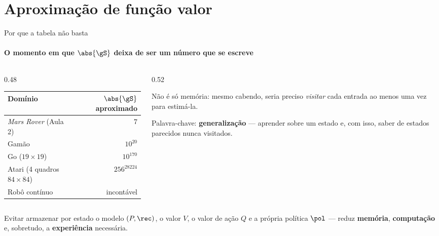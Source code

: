 \documentclass[aspectratio=169, 11pt]{beamer}
\begin{document}
\section{Aproximação de função valor}

\begin{frame}{Por que a tabela não basta}
  \framesubtitle{O momento em que $\abs{\gS}$ deixa de ser um número que se escreve}

  \begin{columns}[T]
    \begin{column}{0.48\textwidth}
      \begin{center}\small
      \begin{tabular}{lr}
        \toprule
        Domínio & $\abs{\gS}$ aproximado \\
        \midrule
        \emph{Mars Rover} (Aula 2) & $7$ \\
        Gamão & $10^{20}$ \\
        Go ($19\times19$) & $10^{170}$ \\
        Atari (4 quadros $84{\times}84$) & $256^{28224}$ \\
        Robô contínuo & incontável \\
        \bottomrule
      \end{tabular}
      \end{center}
    \end{column}
    \begin{column}{0.52\textwidth}
      \begin{alertabox}
        Não é só memória: mesmo cabendo, seria preciso \emph{visitar} cada
        entrada ao menos uma vez para estimá-la.
      \end{alertabox}

      \begin{ideiabox}
        Palavra-chave: \textbf{generalização} — aprender sobre um estado e,
        com isso, saber de estados parecidos nunca visitados.
      \end{ideiabox}
    \end{column}
  \end{columns}

  \smallskip
  {\small Evitar armazenar por estado o modelo $(P,\rec)$, o valor $V$, o
  valor de ação $Q$ e a própria política $\pol$ — reduz \textbf{memória},
  \textbf{computação} e, sobretudo, a \textbf{experiência} necessária.}
\end{frame}
\end{document}
